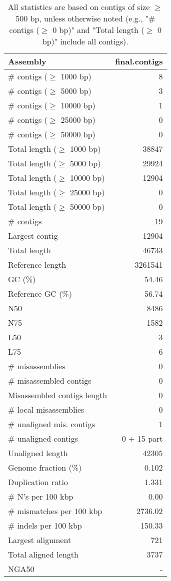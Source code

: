 \documentclass[12pt,a4paper]{article}
\begin{document}
\begin{table}[ht]
\begin{center}
\caption{All statistics are based on contigs of size $\geq$ 500 bp, unless otherwise noted (e.g., "\# contigs ($\geq$ 0 bp)" and "Total length ($\geq$ 0 bp)" include all contigs).}
\begin{tabular}{|l*{1}{|r}|}
\hline
Assembly & final.contigs \\ \hline
\# contigs ($\geq$ 1000 bp) & 8 \\ \hline
\# contigs ($\geq$ 5000 bp) & 3 \\ \hline
\# contigs ($\geq$ 10000 bp) & 1 \\ \hline
\# contigs ($\geq$ 25000 bp) & 0 \\ \hline
\# contigs ($\geq$ 50000 bp) & 0 \\ \hline
Total length ($\geq$ 1000 bp) & 38847 \\ \hline
Total length ($\geq$ 5000 bp) & 29924 \\ \hline
Total length ($\geq$ 10000 bp) & 12904 \\ \hline
Total length ($\geq$ 25000 bp) & 0 \\ \hline
Total length ($\geq$ 50000 bp) & 0 \\ \hline
\# contigs & 19 \\ \hline
Largest contig & 12904 \\ \hline
Total length & 46733 \\ \hline
Reference length & 3261541 \\ \hline
GC (\%) & 54.46 \\ \hline
Reference GC (\%) & 56.74 \\ \hline
N50 & 8486 \\ \hline
N75 & 1582 \\ \hline
L50 & 3 \\ \hline
L75 & 6 \\ \hline
\# misassemblies & 0 \\ \hline
\# misassembled contigs & 0 \\ \hline
Misassembled contigs length & 0 \\ \hline
\# local misassemblies & 0 \\ \hline
\# unaligned mis. contigs & 1 \\ \hline
\# unaligned contigs & 0 + 15 part \\ \hline
Unaligned length & 42305 \\ \hline
Genome fraction (\%) & 0.102 \\ \hline
Duplication ratio & 1.331 \\ \hline
\# N's per 100 kbp & 0.00 \\ \hline
\# mismatches per 100 kbp & 2736.02 \\ \hline
\# indels per 100 kbp & 150.33 \\ \hline
Largest alignment & 721 \\ \hline
Total aligned length & 3737 \\ \hline
NGA50 & - \\ \hline
\end{tabular}
\end{center}
\end{table}
\end{document}
